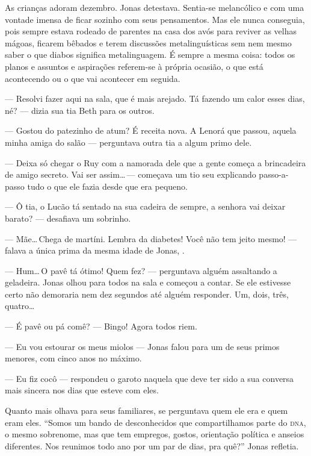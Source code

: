 As crianças adoram dezembro. Jonas detestava. Sentia-se melancólico e com uma vontade imensa de ficar sozinho com seus pensamentos. Mas ele nunca conseguia, pois sempre estava rodeado de parentes\mudanca{,} na casa dos avós\mudanca{,} para reviver as velhas mágoas, ficarem bêbados e terem discussões metalinguísticas sem nem mesmo saber o que diabos significa metalinguagem. É sempre a mesma coisa: todos os planos e assuntos e aspirações referem-se à própria ocasião, o que está acontecendo ou o que vai acontecer em seguida.

--- Resolvi fazer aqui na sala, que é mais arejado. Tá fazendo um calor esses dias, né? --- dizia sua tia Beth para os outros.

--- Gostou do patezinho de atum? É receita nova. A Lenorá que passou, aquela minha amiga do salão --- perguntava outra tia a algum primo dele.

--- Deixa só chegar o Ruy com a namorada dele que a gente começa a brincadeira de amigo secreto. Vai ser assim\ldots\,--- começava um tio seu explicando passo-a-passo tudo o que ele fazia desde que era pequeno.

--- Ô\mudanca{,} tia, o Lucão tá sentado na sua cadeira de sempre, a senhora vai deixar barato? --- desafiava um sobrinho.

--- Mãe\ldots\,Chega de martíni. Lembra da diabetes! Você não tem jeito mesmo! --- falava a única prima da mesma idade de Jonas, .

--- Hum\ldots\,O pavê tá ótimo! Quem fez? --- perguntava alguém\mudanca{,} assaltando a geladeira. Jonas olhou para todos na sala e começou a contar. Se ele estivesse certo não demoraria nem dez segundos até alguém responder. Um, dois, três, quatro\ldots

--- É pavê ou pá comê? --- Bingo! Agora todos riem.

--- Eu vou estourar os meus miolos --- Jonas falou para um de seus primos menores, com cinco anos\mudanca{,} no máximo.

--- Eu fiz cocô --- respondeu o garoto\mudanca{,} naquela que deve ter sido a sua conversa mais sincera nos dias que esteve com eles.

Quanto mais olhava para seus familiares,  se perguntava quem ele era e quem eram eles. ``Somos um bando de desconhecidos que compartilhamos parte do \textsc{dna}, o mesmo sobrenome, mas que tem empregos, gostos, orientação política e anseios diferentes. Nos reunimos todo ano por um par de dias, pra quê?''\mudanca{,} Jonas refletia.

